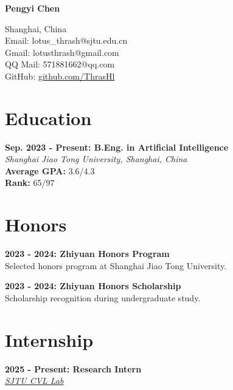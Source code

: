 \documentclass[10pt,a4paper]{article}
\newcommand{\blueitem}[1]{\textcolor{subtitleblue}{\textbf{#1}}}
\begin{document}
\pagestyle{empty}

{\Huge\textbf{\textcolor{titleblue}{Pengyi Chen}}} \vspace{0.2em}

Shanghai, China \\
Email: lotus\_thrash@sjtu.edu.cn \\
Gmail: lotusthrash@gmail.com \\
QQ Mail: 571881662@qq.com \\
GitHub: \href{https://github.com/ThrasHl}{github.com/ThrasHl}

\vspace{0.4em}

\section*{Education}

\blueitem{Sep. 2023 - Present: B.Eng. in Artificial Intelligence} \\
\textit{Shanghai Jiao Tong University, Shanghai, China} \\
\textbf{Average GPA:} 3.6/4.3 \\
\textbf{Rank:} 65/97

\vspace{0.3em}

\section*{Honors}

\blueitem{2023 - 2024: Zhiyuan Honors Program} \\
Selected honors program at Shanghai Jiao Tong University.

\vspace{0.3em}

\blueitem{2023 - 2024: Zhiyuan Honors Scholarship} \\
Scholarship recognition during undergraduate study.

\vspace{0.3em}

\section*{Internship}

\blueitem{2025 - Present: Research Intern} \\
\href{https://cvl.sjtu.edu.cn/}{\textit{SJTU CVL Lab}}
\end{document}
